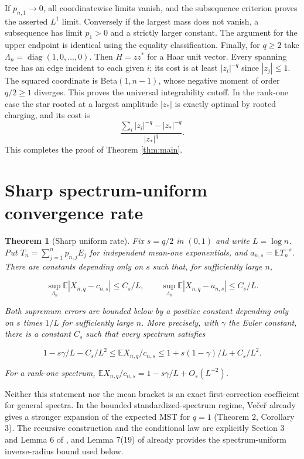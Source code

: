 \documentclass[11pt]{article}
\newtheorem{theorem}{Theorem}
\newcommand{\diag}{\operatorname{diag}}
\begin{document}
If $p_{n,1}\to0$, all coordinatewise limits vanish, and the subsequence criterion proves the asserted $L^1$ limit. Conversely if the largest mass does not vanish, a subsequence has limit $p_1>0$ and a strictly larger constant. The argument for the upper endpoint is identical using the equality classification. Finally, for $q\ge2$ take $\Lambda_n=\diag(1,0,\ldots,0)$. Then $H=zz^*$ for a Haar unit vector. Every spanning tree has an edge incident to each given $i$; its cost is at least $|z_i|^{-q}$ since $|z_j|\le1$. The squared coordinate is Beta$(1,n-1)$, whose negative moment of order $q/2\ge1$ diverges. This proves the universal integrability cutoff. In the rank-one case the star rooted at a largest amplitude $|z_*|$ is exactly optimal by rooted charging, and its cost is
\[
 \frac{\sum_i|z_i|^{-q}-|z_*|^{-q}}{|z_*|^q}.
\]
This completes the proof of Theorem \ref{thm:main}.

\section{Sharp spectrum-uniform convergence rate}\label{sharp-spectrum-uniform-convergence-rate}

\begin{theorem}[Sharp uniform rate] Fix \(s=q/2\) in \((0,1)\) and write \(L=\log n\). Put \(T_n=\sum_{j=1}^n p_{n,j} E_j\) for independent mean-one exponentials, and \(a_{n,s}=\mathbb E T_n^{-s}\). There are constants depending only on \(s\) such that, for sufficiently large \(n\),

\[\sup_{\Lambda_n}\mathbb E|X_{n,q}-c_{n,s}|\le C_s/L,\qquad \sup_{\Lambda_n}\mathbb E|X_{n,q}-a_{n,s}|\le C_s/L.\]

Both supremum errors are bounded below by a positive constant depending only on \(s\) times \(1/L\) for sufficiently large \(n\). More precisely, with \(\gamma\) the Euler constant, there is a constant \(C_s\) such that every spectrum satisfies

\[1-s\gamma/L-C_s/L^2 \le \mathbb E X_{n,q}/c_{n,s}\le 1+s(1-\gamma)/L+C_s/L^2.\]

For a rank-one spectrum, \(\mathbb E X_{n,q}/c_{n,s}=1-s\gamma/L+O_s(L^{-2})\). \end{theorem}

Neither this statement nor the mean bracket is an exact first-correction coefficient for general spectra. In the bounded standardized-spectrum regime, Ve\v{c}e\v{r} already gives a stronger expansion of the expected MST for \(q=1\) (Theorem 2, Corollary 3). The recursive construction and the conditional law are explicitly Section 3 and Lemma 6 of \cite{Vecer}, and Lemma 7(19) of \cite{Vecer} already provides the spectrum-uniform inverse-radius bound used below.
\end{document}

